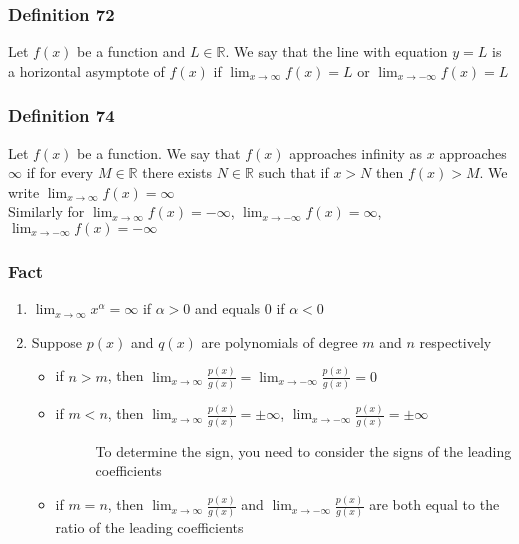 \documentclass[12pt, letterpaper]{article}
\begin{document}
\subsubsection*{Definition 72}
Let $f(x)$ be a function and $L \in \mathbb{R}$. We say that the line with equation $y=L$ is a horizontal asymptote of $f(x)$
if $\displaystyle\lim_{x\to \infty} f(x) = L$ or $\displaystyle\lim_{x\to -\infty} f(x) = L$
\subsubsection*{Definition 74}
Let $f(x)$ be a function. We say that $f(x)$ approaches infinity as $x$ approaches $\infty$ if for every $M\in\mathbb{R}$ there 
exists $N\in\mathbb{R}$ such that if $x>N$ then $f(x) > M$. We write $\displaystyle\lim_{x\to \infty} f(x) = \infty$ \\
Similarly for $\displaystyle\lim_{x\to \infty} f(x) = -\infty$, $\displaystyle\lim_{x\to -\infty} f(x) = \infty$, $\displaystyle\lim_{x\to -\infty} f(x) = -\infty$
\subsubsection*{Fact}
\begin{enumerate}
    \item $\displaystyle\lim_{x\to \infty} x^\alpha = \infty$ if $\alpha >0$ and equals 0 if $\alpha < 0$
    \item Suppose $p(x)$ and $q(x)$ are polynomials of degree $m$ and $n$ respectively
    \begin{itemize}
        \item if $n > m$, then $\displaystyle\lim_{x\to \infty} \frac{p(x)}{g(x)} = \displaystyle\lim_{x\to -\infty} \frac{p(x)}{g(x)} = 0$
        \item if $m < n$, then $\displaystyle\lim_{x\to \infty} \frac{p(x)}{g(x)} = \pm\infty$, $\displaystyle\lim_{x\to -\infty} \frac{p(x)}{g(x)} = \pm\infty$
        \begin{description}
            \item[] To determine the sign, you need to consider the signs of the leading coefficients 
        \end{description}
        \item if $m = n$, then $\displaystyle\lim_{x\to \infty} \frac{p(x)}{g(x)}$ and $\displaystyle\lim_{x\to -\infty} \frac{p(x)}{g(x)}$ are both equal to the ratio of the leading coefficients
    \end{itemize}
\end{enumerate}
\end{document}

